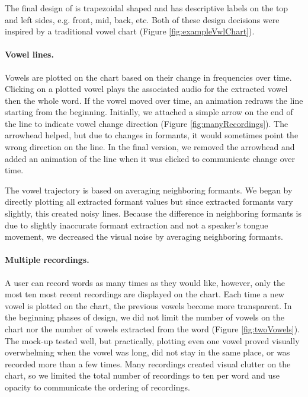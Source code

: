 \subsubsection{\visowel{}} 
The final design of \visowel{} is trapezoidal shaped and has descriptive labels on the top and left sides, e.g. front, mid, back, etc. Both of these design decisions were inspired by a traditional vowel chart (Figure \ref{fig:exampleVwlChart}). 

\paragraph{Vowel lines.} Vowels are plotted on the chart based on their change in frequencies over time. Clicking on a plotted vowel plays the associated audio for the extracted vowel then the whole word. If the vowel moved over time, an animation redraws the line starting from the beginning. Initially, we attached a simple arrow on the end of the line to indicate vowel change direction (Figure \ref{fig:manyRecordings}). The arrowhead helped, but due to changes in formants, it would sometimes point the wrong direction on the line. In the final version, we removed the arrowhead and added an animation of the line when it was clicked to communicate change over time. 

The vowel trajectory is based on averaging neighboring formants. We began by directly plotting all extracted formant values but since extracted formants vary slightly, this created noisy lines. Because the difference in neighboring formants is due to slightly inaccurate formant extraction and not a speaker's tongue movement, we decreased the visual noise by averaging neighboring formants. 

\paragraph{Multiple recordings.} A user can record words as many times as they would like, however, only the most ten most recent recordings are displayed on the chart. Each time a new vowel is plotted on the chart, the previous vowels become more transparent. In the beginning phases of design, we did not limit the number of vowels on the chart nor the number of vowels extracted from the word (Figure \ref{fig:twoVowels}). The mock-up tested well, but practically, plotting even one vowel proved visually overwhelming when the vowel was long, did not stay in the same place, or was recorded more than a few times. Many recordings created visual clutter on the chart, so we limited the total number of recordings to ten per word and use opacity to communicate the ordering of recordings.

